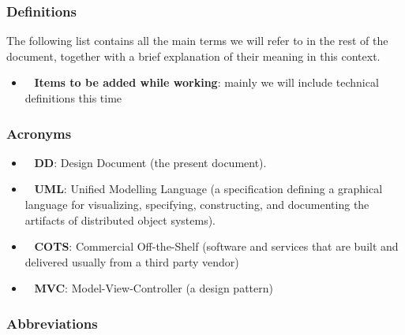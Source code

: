 \subsubsection{Definitions}

The following list contains all the main terms we will refer to in the rest of the document, together with a brief explanation of their meaning in this context.

\begin{itemize}
\item~ \textbf{Items to be added while working}: mainly we will include technical definitions this time
\end{itemize}

\subsubsection{Acronyms}

\begin{itemize}
\item~ \textbf{DD}: Design Document (the present document).
\item~ \textbf{UML}: Unified Modelling Language (a specification defining a graphical language for visualizing, specifying, constructing, and documenting the artifacts of distributed object systems).
\item~ \textbf{COTS}: Commercial Off-the-Shelf (software and services that are built and delivered usually from a third party vendor)
\item~ \textbf{MVC}: Model-View-Controller (a design pattern)
\end{itemize}

\subsubsection{Abbreviations}

